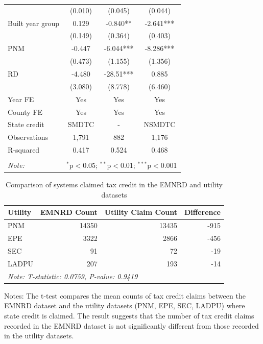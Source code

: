 \documentclass[11pt,twoside,letterpaper]{article}
\begin{document}
\begin{table}[H]
{\begin{tabular}{lccc}
 & (0.010) & (0.045) & (0.044) \\
Built year group & 0.129 & -0.840** & -2.641*** \\
 & (0.149) & (0.364) & (0.403) \\
PNM & -0.447 & -6.044*** & -8.286*** \\
 & (0.473) & (1.155) & (1.356) \\
RD & -4.480 & -28.51*** & 0.885 \\
 & (3.080) & (8.778) & (6.460) \\ \cline{1-4}
Year FE & Yes & Yes & Yes \\
County FE & Yes & Yes & Yes \\
State credit & SMDTC & - & NSMDTC \\
Observations & 1,791 & 882 & 1,176 \\
R-squared & 0.417 & 0.524 & 0.468 \\ 
\hline
\hline \\[-1.8ex]
\textit{Note:} & \multicolumn{3}{r}{$^{*}$p$<$0.05; $^{**}$p$<$0.01; $^{***}$p$<$0.001} \\
\end{tabular}}
\end{table}



\begin{table}[H] 
\caption{Comparison of systems claimed tax credit in the EMNRD and utility datasets}
\label{tab:compare_emnrd_utility}
\centering
\begin{tabular}{lrrr}
\toprule
Utility & EMNRD Count & Utility Claim Count & Difference \\
\midrule
PNM & 14350 & 13435 & -915 \\
EPE & 3322 & 2866 & -456 \\
SEC & 91 & 72 & -19 \\
LADPU & 207 & 193 & -14 \\
\bottomrule
\multicolumn{4}{l}{\textit{Note:  T-statistic: 0.0759, P-value: 0.9419}} \\
\end{tabular}


\begin{flushleft}\footnotesize{Notes: The t-test compares the mean counts of tax credit claims between the EMNRD dataset and the utility datasets (PNM, EPE, SEC, LADPU) where state credit is claimed. The result suggests that the number of tax credit claims recorded in the EMNRD dataset is not significantly different from those recorded in the utility datasets.}
\end{flushleft}
\end{table}
\end{document}
